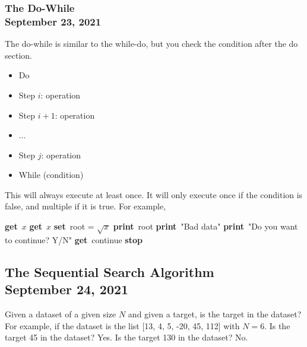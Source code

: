 \documentclass[]{article}
\newcommand{\Get}{\State \textbf{get}~}
\newcommand{\Set}{\State \textbf{set}~}
\newcommand{\Print}{\State \textbf{print}~}
\newcommand{\Stop}{\State \textbf{stop}~}
\begin{document}
\subsubsection{The Do-While\\ {\normalfont September 23, 2021}}
\bigbreak

The do-while is similar to the while-do, but you check the condition after the do section.

\begin{itemize}
	\item Do \setlength{\itemindent}{0.5cm}
	\item Step $i$: operation
	\item Step $i + 1$: operation
	\item ...
	\item Step $j$: operation
	\setlength{\itemindent}{0cm}\item While (condition)\smallskip
\end{itemize}

This will always execute at least once. It will only execute once if the condition is false, and multiple if it is true. For example,

\begin{algorithm}
	\caption{\\Read a var $x$, print $\sqrt{x}$ and repeat the process as long as requested by user.}
	\begin{algorithmic}[1]
		\Get $x$
		\Do
			\Get $x$
				\Set root = $\sqrt{x}$
				\Print root
			\Else
				\Print "Bad data"
			\EndIf
			\Print "Do you want to continue? Y/N"
			\Get continue
		\Stop
	\end{algorithmic}
\end{algorithm}


\subsection{The Sequential Search Algorithm\\ {\normalfont September 24, 2021}} \label{sequentialsearchalgorithm}
\bigbreak

Given a dataset of a given size $N$ and given a target, is the target in the dataset?\\

For example, if the dataset is the list [13, 4, 5, -20, 45, 112] with $N = 6$. Is the target 45 in the dataset? Yes. Is the target 130 in the dataset? No. \\
\end{document}
